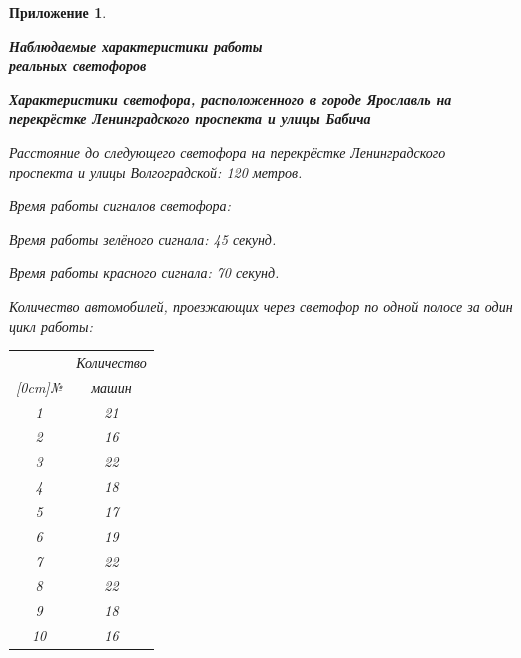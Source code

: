 \documentclass[12pt, a4paper]{extarticle}
\numberwithin{equation}{section}
\newtheorem{attachment}{\hspace{12cm}  Приложение}
\numberwithin{figure}{section}
\begin{document}
\newpage

\begin{attachment} \label{att}
	\begin{center}
		\vspace{1cm}
		\rm{\Large{\textbf{ Наблюдаемые характеристики работы \\ реальных светофоров }}}
		\vspace{\baselineskip}
	\end{center}

\textup{\textbf{Характеристики светофора, расположенного в городе Ярославль на перекрёстке Ленинградского проспекта и улицы Бабича }}
\newline

\noindent\textup{Расстояние до следующего светофора на перекрёстке Ленинградского проспекта и улицы Волгоградской:} 120 метров.

\noindent\textup{Время работы сигналов светофора:}

Время работы зелёного сигнала: 45 секунд.
			
Время работы красного сигнала: 70 секунд.

\noindent\textup{Количество автомобилей, проезжающих через светофор по одной полосе за один цикл работы:}
	
\begin{table}[h!]
	\begin{minipage}{0.23\linewidth}
		
		\centering
		\begin{tabular}{|c|c|}
			\hline
			 & Количество \\ 
			 \raisebox{1.5ex}[0cm]{№}
			 & машин 
			\\\hline
			1 & 21
			\\\hline
			2 & 16
			\\\hline
			3 & 22
			\\\hline
			4 & 18
			\\\hline
			5 & 17
			\\\hline
			6 & 19
			\\\hline
			7 & 22
			\\\hline
			8 & 22
			\\\hline
			9 & 18
			\\\hline
			10 & 16
			\\\hline
		\end{tabular}
	\end{minipage}
	\begin{minipage}{0.23\linewidth}
		\centering
		

\end{minipage}
\end{table}
\end{attachment}
\end{document}
